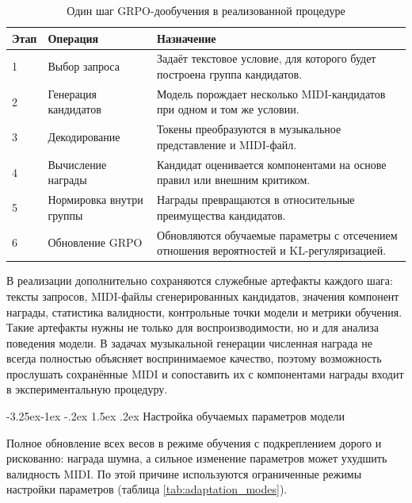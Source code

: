 \documentclass[a4paper,12pt]{extarticle}
\makeatletter
\renewcommand\subsection{\@startsection{subsection}{2}{\z@}%
  {-3.25ex\@plus -1ex \@minus -.2ex}%
  {1.5ex \@plus .2ex}%
  {\normalfont\large\bfseries\Needspace{6\baselineskip}}}
\makeatother
\begin{document}
\begin{table}[ht]
\centering
\caption{Один шаг GRPO-дообучения в реализованной процедуре}
\label{tab:grpo_training_step}
\begin{tabular}{|p{}|p{}|p{}|}
\hline
\textbf{Этап} & \textbf{Операция} & \textbf{Назначение} \\
\hline
1 & Выбор запроса & Задаёт текстовое условие, для которого будет построена группа кандидатов. \\
\hline
2 & Генерация кандидатов & Модель порождает несколько MIDI-кандидатов при одном и том же условии. \\
\hline
3 & Декодирование & Токены преобразуются в музыкальное представление и MIDI-файл. \\
\hline
4 & Вычисление награды & Кандидат оценивается компонентами на основе правил или внешним критиком. \\
\hline
5 & Нормировка внутри группы & Награды превращаются в относительные преимущества кандидатов. \\
\hline
6 & Обновление GRPO & Обновляются обучаемые параметры с отсечением отношения вероятностей и KL-регуляризацией. \\
\hline
\end{tabular}
\end{table}

В реализации дополнительно сохраняются служебные артефакты каждого шага:
тексты запросов, MIDI-файлы сгенерированных кандидатов, значения
компонент награды, статистика валидности, контрольные точки модели и метрики обучения.
Такие артефакты нужны не только для воспроизводимости, но и для анализа
поведения модели. В задачах музыкальной генерации численная награда не всегда
полностью объясняет воспринимаемое качество, поэтому возможность
прослушать сохранённые MIDI и сопоставить их с компонентами награды
входит в экспериментальную процедуру.

\subsection{Настройка обучаемых параметров модели}

Полное обновление всех весов в режиме обучения с подкреплением дорого и
рискованно: награда шумна, а сильное изменение параметров может ухудшить
валидность MIDI. По этой причине используются ограниченные режимы настройки параметров
(таблица \ref{tab:adaptation_modes}).
\end{document}
